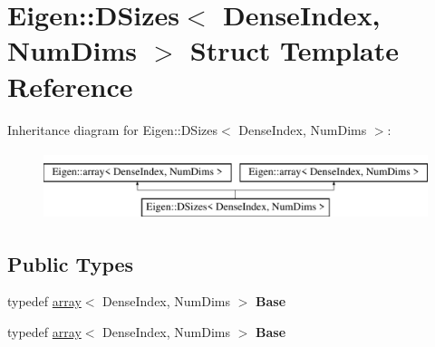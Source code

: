 \hypertarget{struct_eigen_1_1_d_sizes}{}\section{Eigen\+:\+:D\+Sizes$<$ Dense\+Index, Num\+Dims $>$ Struct Template Reference}
\label{struct_eigen_1_1_d_sizes}
Inheritance diagram for Eigen\+:\+:D\+Sizes$<$ Dense\+Index, Num\+Dims $>$\+:\begin{figure}[H]
\begin{center}
\leavevmode
\includegraphics[height=2.000000cm]{struct_eigen_1_1_d_sizes}
\end{center}
\end{figure}
\subsection*{Public Types}
\begin{DoxyCompactItemize}
\item 
\mbox{\label{struct_eigen_1_1_d_sizes_ac6d63e154c73abcc359cb04a37467f8f}} 
typedef \hyperlink{class_eigen_1_1array}{array}$<$ Dense\+Index, Num\+Dims $>$ {\bfseries Base}
\item 
\mbox{\label{struct_eigen_1_1_d_sizes_ac6d63e154c73abcc359cb04a37467f8f}} 
typedef \hyperlink{class_eigen_1_1array}{array}$<$ Dense\+Index, Num\+Dims $>$ {\bfseries Base}
\end{DoxyCompactItemize}
